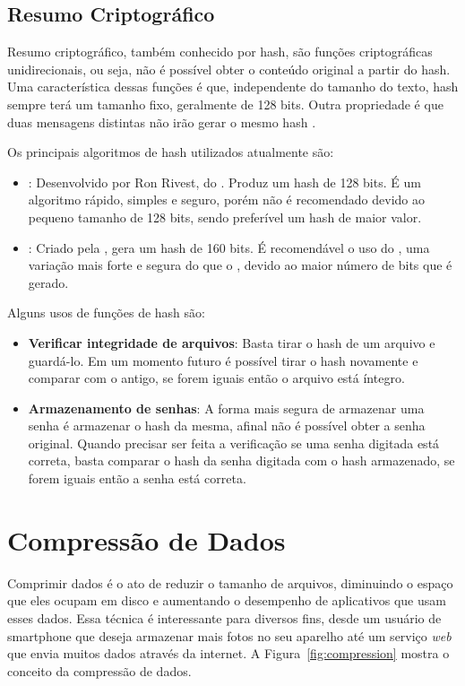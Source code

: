 \subsection{Resumo Criptográfico}

Resumo criptográfico, também conhecido por hash, são funções criptográficas unidirecionais, ou seja, não é possível obter o conteúdo original a partir do hash. Uma característica dessas funções é que, independente do tamanho do texto, hash sempre terá um tamanho fixo, geralmente de 128 bits. Outra propriedade é que duas mensagens distintas não irão gerar o mesmo hash \cite{Pfleeger2015}.

Os principais algoritmos de hash utilizados atualmente são:
\begin{itemize}
    \item \mdd: Desenvolvido por Ron Rivest, do \mitt. Produz um hash de 128 bits. É um algoritmo rápido, simples e seguro, porém não é recomendado devido ao pequeno tamanho de 128 bits, sendo preferível um hash de maior valor.
    \item \sha: Criado pela \nsa, gera um hash de 160 bits. É recomendável o uso do , uma variação mais forte e segura do que o , devido ao maior número de bits que é gerado.
\end{itemize}

Alguns usos de funções de hash são:

\begin{itemize}
    \item \textbf{Verificar integridade de arquivos}: Basta tirar o hash de um arquivo e guardá-lo. Em um momento futuro é possível tirar o hash novamente e comparar com o antigo, se forem iguais então o arquivo está íntegro.
    \item \textbf{Armazenamento de senhas}: A forma mais segura de armazenar uma senha é armazenar o hash da mesma, afinal não é possível obter a senha original. Quando precisar ser feita a verificação se uma senha digitada está correta, basta comparar o hash da senha digitada com o hash armazenado, se forem iguais então a senha está correta.
\end{itemize}

\section{Compressão de Dados}

Comprimir dados é o ato de reduzir o tamanho de arquivos, diminuindo o espaço que eles ocupam em disco e aumentando o desempenho de aplicativos que usam esses dados. Essa técnica é interessante para diversos fins, desde um usuário de smartphone que deseja armazenar mais fotos no seu aparelho até um serviço \textit{web} que envia muitos dados através da internet. A Figura~\ref{fig:compression} mostra o conceito da compressão de dados.

